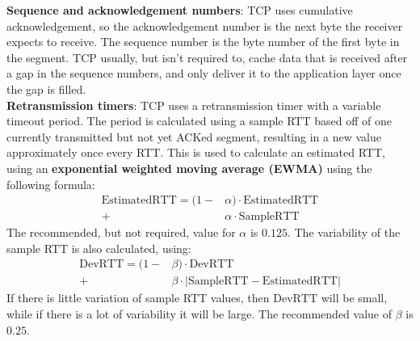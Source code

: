\textbf{Sequence and acknowledgement numbers}: TCP uses cumulative acknowledgement, so the acknowledgement number is the next byte the receiver expects to receive. The sequence number is the byte number of the first byte in the segment. TCP usually, but isn't required to, cache data that is received after a gap in the sequence numbers, and only deliver it to the application layer once the gap is filled.\\
\textbf{Retransmission timers}: TCP uses a retransmission timer with a variable timeout period. The period is calculated using a sample RTT based off of one currently transmitted but not yet ACKed segment, resulting in a new value approximately once every RTT. This is used to calculate an estimated RTT, using an \textbf{exponential weighted moving average (EWMA)} using the following formula:
$$
	\begin{aligned}
		\text{EstimatedRTT}  =  (1- & \alpha)\cdot\text{EstimatedRTT} \\
		+                           & \alpha\cdot\text{SampleRTT}
	\end{aligned}
$$
The recommended, but not required, value for $\alpha$ is $0.125$.
The variability of the sample RTT is also calculated, using:
$$
	\begin{aligned}
		\text{DevRTT}=(1- & \beta)\cdot\text{DevRTT}                                            \\
		+                 & \beta\cdot\left\vert\text{SampleRTT}-\text{EstimatedRTT}\right\vert
	\end{aligned}
$$
If there is little variation of sample RTT values, then $\text{DevRTT}$ will be small, while if there is a lot of variability it will be large.
The recommended value of $\beta$ is $0.25$.

